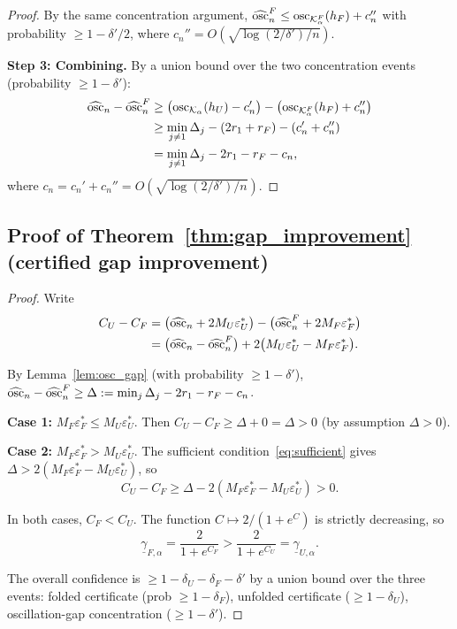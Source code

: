 \begin{proof}
  By the same concentration argument,
  $\widehat{\mathrm{osc}}_n^F \leq \mathrm{osc}_{\mathcal{K}_\alpha^F}(h_F) + c_n''$
  with probability $\geq 1 - \delta'/2$, where
  $c_n'' = O(\sqrt{\log(2/\delta')/n})$.

  \textbf{Step 3: Combining.}
  By a union bound over the two concentration events
  (probability $\geq 1 - \delta'$):
  \begin{align*}
    \widehat{\mathrm{osc}}_n - \widehat{\mathrm{osc}}_n^F
    &\geq \bigl(\mathrm{osc}_{\mathcal{K}_\alpha}(h_U) - c_n'\bigr)
    - \bigl(\mathrm{osc}_{\mathcal{K}_\alpha^F}(h_F) + c_n''\bigr) \\
    &\geq \min_{j \neq 1}\Delta_j - (2r_1 + r_F) - (c_n' + c_n'')
    \\
    &= \min_{j \neq 1}\Delta_j - 2r_1 - r_F - c_n,
  \end{align*}
  where $c_n = c_n' + c_n'' = O(\sqrt{\log(2/\delta')/n})$.
\end{proof}


\subsection{Proof of Theorem~\ref{thm:gap_improvement}
  (certified gap improvement)}
\label{app:proof_gap}

\begin{proof}
  Write
  \begin{align*}
    C_U - C_F
    &= \bigl(\widehat{\mathrm{osc}}_n + 2M_U\varepsilon_U^*\bigr)
    - \bigl(\widehat{\mathrm{osc}}_n^F + 2M_F\varepsilon_F^*\bigr) \\
    &= \bigl(\widehat{\mathrm{osc}}_n - \widehat{\mathrm{osc}}_n^F\bigr)
    + 2\bigl(M_U\varepsilon_U^* - M_F\varepsilon_F^*\bigr).
  \end{align*}

  By Lemma~\ref{lem:osc_gap} (with probability
  $\geq 1 - \delta'$),
  $\widehat{\mathrm{osc}}_n - \widehat{\mathrm{osc}}_n^F \geq \Delta
  := \min_j \Delta_j - 2r_1 - r_F - c_n$.

  \textbf{Case 1:}
  $M_F\varepsilon_F^* \leq M_U\varepsilon_U^*$.
  Then $C_U - C_F \geq \Delta + 0 = \Delta > 0$
  (by assumption $\Delta > 0$).

  \textbf{Case 2:}
  $M_F\varepsilon_F^* > M_U\varepsilon_U^*$.
  The sufficient condition~\eqref{eq:sufficient} gives
  $\Delta > 2(M_F\varepsilon_F^* - M_U\varepsilon_U^*)$, so
  \[
    C_U - C_F
    \geq \Delta - 2(M_F\varepsilon_F^* - M_U\varepsilon_U^*) > 0.
  \]

  In both cases, $C_F < C_U$.  The function
  $C \mapsto 2/(1 + e^C)$ is strictly decreasing, so
  \[
    \underline{\gamma}_{F,\alpha}
    = \frac{2}{1 + e^{C_F}}
    > \frac{2}{1 + e^{C_U}}
    = \underline{\gamma}_{U,\alpha}.
  \]

  The overall confidence is $\geq 1 - \delta_U - \delta_F - \delta'$
  by a union bound over the three events:
  folded certificate (prob $\geq 1 - \delta_F$),
  unfolded certificate ($\geq 1 - \delta_U$),
  oscillation-gap concentration ($\geq 1 - \delta'$).
\end{proof}


